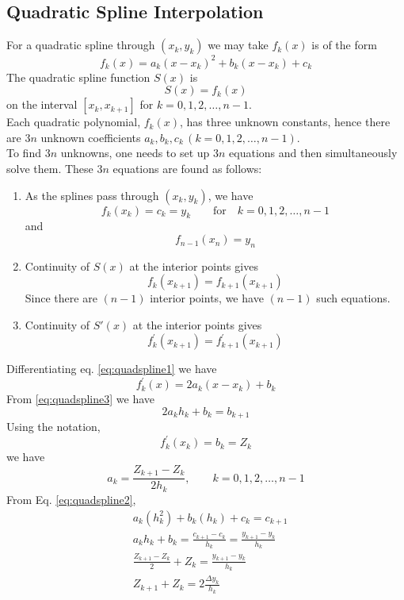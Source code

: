 \documentclass[12pt,class=book,crop=false]{standalone}
\begin{document}
\subsection{Quadratic Spline Interpolation}
For a quadratic spline through $ (x_k,y_k) $ we may take $ f_k (x) $ is of the form
\begin{equation}
	\label{eq:quadspline1}
	f_k(x)=a_k (x-x_k)^2+b_k (x-x_k)+c_k
\end{equation}
The quadratic spline function $ S(x) $ is
\[
	S(x)=f_k (x)
\]
on the interval $ [x_k, x_{k+1}] $ for $ k = 0, 1, 2,\dots, n-1 $.\\
Each quadratic polynomial, $ f_k (x) $, has three unknown constants, hence there are $ 3n $ unknown coefficients $ a_k, b_k, c_k\,(k = 0, 1, 2, \dots, n-1) $.\\
To find $ 3n $ unknowns, one needs to set up $ 3n $ equations and then simultaneously solve them. These $ 3n $ equations are found as follows:
\begin{enumerate}
	\item As the splines pass through $ (x_k,y_k) $, we have
	      \[
		      f_k (x_k)=c_k=y_k\qquad \text{for}\quad k = 0, 1, 2,\dots, n-1
	      \]
	      and
	      \[
		      f_{n-1} (x_n)=y_n
	      \]
	\item Continuity of $ S(x) $ at the interior points gives
	      \begin{equation}
		      \label{eq:quadspline2}
		      f_k (x_{k+1})=f_{k+1} (x_{k+1})
	      \end{equation}
	      Since there are $ (n-1) $ interior points, we have $ (n-1) $ such equations.
	\item Continuity of $ S' (x) $ at the interior points gives
	      \begin{equation}
		      \label{eq:quadspline3}
		      f_k^{'} (x_{k+1})=f_{k+1}^{'} (x_{k+1})
	      \end{equation}
\end{enumerate}
Differentiating eq. \eqref{eq:quadspline1} we have
\[
	f_k^{'} (x)=2a_k (x-x_k)+b_k
\]
From \eqref{eq:quadspline3} we have
\[
	2a_k h_k+b_k=b_{k+1}
\]
Using the notation,
\[
	f_k^{'}(x_k)=b_k=Z_k
\]
we have
\[
	a_k=\frac{Z_{k+1}-Z_k}{2h_k},\qquad k = 0, 1, 2, \dots, n-1
\]
From Eq. \eqref{eq:quadspline2},
\begin{align*}
	 & a_k (h_k^2)+b_k (h_k)+c_k=c_{k+1}                            \\
	 & a_k h_k+b_k=\frac{c_{k+1}-c_k}{h_k} =\frac{y_{k+1}-y_k}{h_k} \\
	 & \frac{Z_{k+1}-Z_k}{2}+Z_k=\frac{y_{k+1}-y_k}{h_k}            \\
	 & Z_{k+1}+Z_k=2\frac{\Delta y_k}{h_k}
\end{align*}
\end{document}
